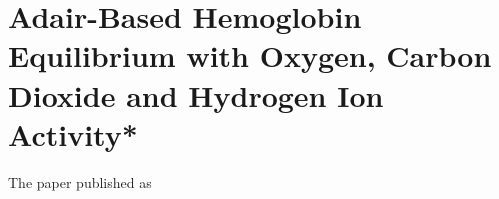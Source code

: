 \chapter{Adair-Based Hemoglobin Equilibrium with Oxygen, Carbon Dioxide and Hydrogen Ion Activity*}\label{app:adair}
The paper \cite{Matejak2014sj} published as
 




